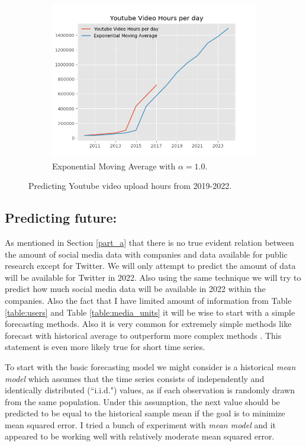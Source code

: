 \begin{figure}[t]
\begin{subfigure}[t]{0.30\linewidth}
\includegraphics[width=\linewidth ]{fig/yt_ema.png}
\caption{{\footnotesize Exponential Moving Average with $\alpha = 1.0$.}}\vspace{-2mm}
\label{fig:pla2}
\end{subfigure}
\caption{Predicting Youtube video upload hours from 2019-2022.}\vspace{-2mm}
\label{fig:youtube_upload}
\end{figure}



\subsection*{Predicting future:}
As mentioned in Section \ref{part_a} that there is no true evident relation between the amount of social media data with companies and data available for public research except for Twitter. We will only attempt to predict the amount of data will be available for Twitter in 2022. Also using the same technique we will try to predict how much social media data will be available in 2022 within the companies.
Also the fact that I have limited amount of information from Table \ref{table:users} and Table \ref{table:media_units} it will be wise to start with a simple forecasting methods. Also it is very common for extremely simple methods like forecast with historical average to outperform more complex methods \cite{simple_forecast}. This statement is even more likely true for short time series.



To start with the basic forecasting model we might consider is a historical {\em mean model} which assumes that the time series consists of independently and identically distributed (``i.i.d.") values, as if each observation is randomly drawn from the same population. Under this assumption, the next value should be predicted to be equal to the historical sample mean if the goal is to minimize mean squared error. I tried a bunch of experiment with {\em mean model} and it appeared to be working well with relatively moderate mean squared error.

